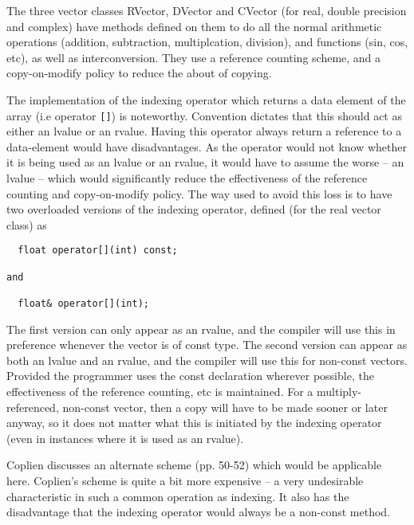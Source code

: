 The three vector classes RVector, DVector and CVector (for real, double
precision and complex) have methods defined on them to do all the normal
arithmetic operations (addition, subtraction, multiplcation, division),
and functions (sin, cos, etc), as well as interconversion. They use a 
reference counting scheme, and a copy-on-modify policy to reduce the
about of copying. 

The implementation of the indexing operator which returns a data element
of the array (i.e operator {\tt []}) is noteworthy. Convention dictates
that this should act as either an lvalue or an rvalue. 
Having this operator always return a reference to a data-element would have
disadvantages. As the operator would not know whether it is being used as an
lvalue or an rvalue, it would have to assume the worse -- an lvalue -- which
would significantly reduce the effectiveness of the reference counting and
copy-on-modify policy. The way used to avoid this loss is to have two
overloaded versions of the indexing operator, defined (for the real vector
class) as

\begin{verbatim}
  float operator[](int) const;

and

  float& operator[](int);
\end{verbatim}

The first version can only appear as an rvalue, and the compiler will
use this in preference whenever the vector is of const type. The second
version can appear as both an lvalue and an rvalue, and the compiler will
use this for non-const vectors. Provided the programmer uses the const
declaration wherever possible, the effectiveness of the reference
counting, etc is maintained. For a multiply-referenced, non-const vector,
then a copy will have to be made sooner or later anyway, so it does not
matter what this is initiated by the indexing operator (even in instances
where it is used as an rvalue).

Coplien discusses an alternate scheme (pp. 50-52) which would be applicable
here. Coplien's scheme is quite a bit more expensive -- a very undesirable
characteristic in such a common operation as indexing. It also has the
disadvantage that the indexing operator would always be a non-const method.



